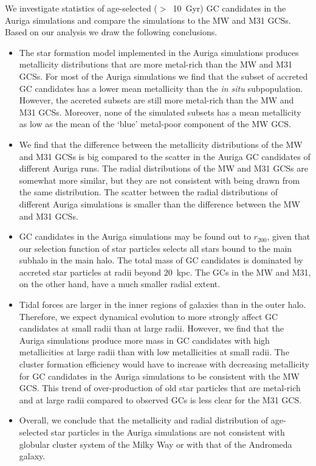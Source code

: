 \documentclass[a4paper,fleqn,usenatbib]{mnras}
\begin{document}
We investigate statistics of age-selected ($>$~10~Gyr) GC candidates in the 
Auriga simulations and compare the simulations to the MW and M31 GCSs. Based on
our analysis we draw the following conclusions.

\begin{itemize}
    \item The star formation model implemented in the Auriga simulations produces
    metallicity distributions that are more metal-rich than the MW and M31
    GCSs. For most of the Auriga simulations we find that the subset of accreted 
    GC candidates has a lower mean metallicity than the {\it in situ} subpopulation.
    However, the accreted subsets are still more metal-rich than the MW and M31 GCSs.
    Moreover, none of the simulated subsets has a mean metallicity as low as the mean
    of the `blue' metal-poor component of the MW GCS.

    \item We find that the difference between the metallicity distributions of 
    the MW and M31 GCSs is big compared to the scatter in the Auriga GC candidates 
    of different Auriga runs. The radial distributions of the MW and M31 GCSs are
    somewhat more similar, but they are not consistent with being drawn from the
    same distribution. The scatter between the radial distributions of different
    Auriga simulations is smaller than the difference between the MW and M31 GCSs.

    \item GC candidates in the Auriga simulations may be found out to $r_{200}$,
    given that our selection function of star particles selects all stars bound
    to the main subhalo in the main halo. The total mass of GC candidates is 
    dominated by accreted star particles at radii beyond $20$~kpc. The GCs in 
    the MW and M31, on the other hand, have a much smaller radial extent.

    \item Tidal forces are larger in the inner regions of galaxies than in the
    outer halo. Therefore, we expect dynamical evolution to more strongly affect 
    GC candidates at small radii than at large radii. However,
    we find that the Auriga simulations produce more mass in GC candidates with
    high metallicities at large radii than with low metallicities at small radii.
    The cluster formation efficiency would have to increase with decreasing
    metallicity for GC candidates in the Auriga simulations to be consistent
    with the MW GCS. This trend of over-production of old star particles that 
    are metal-rich and at large radii compared to observed GCs is less clear for 
    the M31 GCS.

    \item
    Overall, we conclude that the metallicity and radial distribution of age-selected
    star particles in the Auriga simulations are not consistent with globular 
    cluster system of the Milky Way or with that of the Andromeda galaxy.


\end{itemize}
\end{document}
